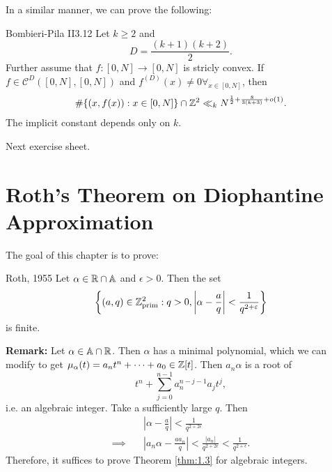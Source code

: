 \documentclass{Vorlesungstemplate_English} %
\begin{document}
In a similar manner, we can prove the following:
\begin{theorem}{Bombieri-Pila II}{3.12}
Let $k \geq 2$ and
\[ D = \frac{(k+1)(k+2)}{2}.\]
Further assume that $f: [0,N] \to [0,N]$ is stricly convex. If $f \in \mathcal{C}^D([0,N],[0,N])$ and $f^{(D)}(x) \neq 0 \forall_{x \in [0,N]}$, then
\begin{align*}
  \#\{ (x,f(x)): x \in [0,N]\} \cap \mathbb{Z}^2 \ll_k N^{\frac{1}{2}+\frac{8}{3(k+3)}+o(1)}.
\end{align*}
The implicit constant depends only on $k$.
\end{theorem}
\begin{pf}
  Next exercise sheet.
\end{pf}
\chapter{Roth's Theorem on Diophantine Approximation}
The goal of this chapter is to prove:
\begin{theorem*}{Roth, 1955}
  Let $\alpha \in \mathbb{R} \cap \mathbb{A}$ and $\epsilon > 0$. Then the set
  \[ \left\{ (a,q) \in \mathbb{Z}_{\text{prim}}^{2}: q>0, \left|\alpha-\frac{a}{q}\right| < \frac{1}{q^{2+\varepsilon}}\right\}\]
  is finite.
\end{theorem*}
\noindent \textbf{Remark:} Let $\alpha \in \mathbb{A} \cap \mathbb{R}$. Then $\alpha$ has a minimal polynomial, which we can modify to get $\mu_{\alpha}(t) = a_nt^n + \dots + a_0 \in \mathbb{Z}[t]$. Then $a_n\alpha$ is a root of
\[ t^n + \sum_{j=0}^{n-1}a_n^{n-j-1}a_jt^j,\]
i.e. an algebraic integer. Take a sufficiently large $q$. Then
\begin{align*}
  & \left|\alpha - \frac{a}{q}\right| < \frac{1}{q^{2+2\epsilon}} \\
  \implies \quad & \left|a_n\alpha - \frac{aa_n}{q}\right| < \frac{|a_n|}{q^{2+2\epsilon}} < \frac{1}{q^{2+\epsilon}}.
\end{align*}
Therefore, it suffices to prove Theorem \ref{thm:1.3} for algebraic integers.
\end{document}
